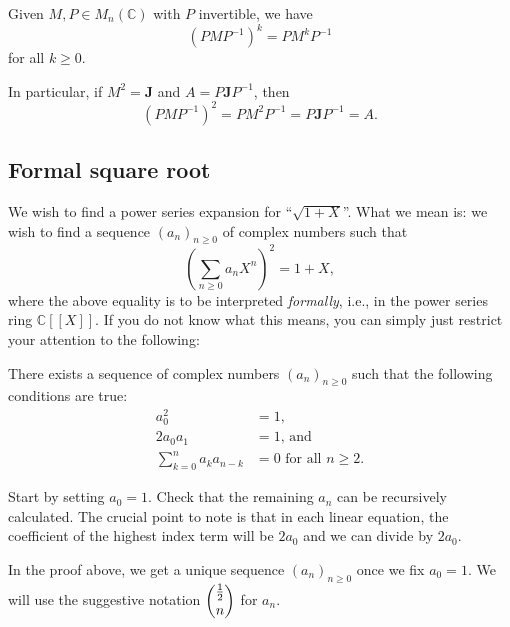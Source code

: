 \documentclass[12pt]{article}
\begin{document}
\begin{obs} 
	Given $M, P \in M_{n}(\mathbb{C})$ with $P$ invertible, we have
	\begin{equation*} 
		(P M P^{-1})^{k} = P M^{k} P^{-1}
	\end{equation*}
	for all $k \ge 0$.

	In particular, if $M^{2} = \mathbf{J}$ and $A = P\mathbf{J}P^{-1}$, then
	\begin{equation*} 
		(PMP^{-1})^{2} = PM^{2}P^{-1} = P\mathbf{J}P^{-1} = A.
	\end{equation*}
\end{obs}

\subsection{Formal square root}

We wish to find a power series expansion for ``$\sqrt{1 + X}$''. What we mean is: we wish to find a sequence $(a_{n})_{n \ge 0}$ of complex numbers such that
\begin{equation*} 
	\left(\sum_{n \ge 0} a_{n} X^{n}\right)^{2} = 1 + X,
\end{equation*}
where the above equality is to be interpreted \emph{formally}, i.e., in the power series ring $\mathbb{C}[\![X]\!]$. If you do not know what this means, you can simply just restrict your attention to the following:

\begin{prop} \label{prop:formal-square-root}
	There exists a sequence of complex numbers $(a_{n})_{n \ge 0}$ such that the following conditions are true:
	\begin{align*} 
		a_{0}^{2} &= 1,\\
		2a_{0}a_{1} &= 1,\,\text{and} \\
		\sum_{k = 0}^{n} a_{k} a_{n - k} &= 0 \text{ for all $n \ge 2$.}
	\end{align*}
\end{prop}
\begin{sketch} 
	Start by setting $a_{0} = 1$. Check that the remaining $a_{n}$ can be recursively calculated. The crucial point to note is that in each linear equation, the coefficient of the highest index term will be $2a_{0}$ and we can divide by $2a_{0}$.
\end{sketch}

In the proof above, we get a unique sequence $(a_{n})_{n \ge 0}$ once we fix $a_{0} = 1$. We will use the suggestive notation $\dbinom{\frac{1}{2}}{n}$ for $a_{n}$.
\end{document}
